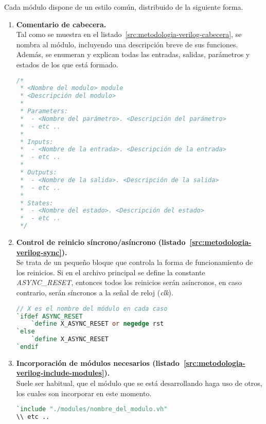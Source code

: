 Cada módulo dispone de un estilo común, distribuido de la siguiente forma.
\begin{enumerate}
    \item{\textbf{Comentario de cabecera.}} \\
    Tal como se muestra en el listado~\ref{src:metodologia-verilog-cabecera}, se nombra al módulo, incluyendo una descripción breve de sus funciones. Además, se enumeran y explican todas las entradas, salidas, parámetros y estados de los que está formado.
    \begin{lstlisting}[language=Verilog,
        caption={Ejemplo de comentario de cabecera del módulo.},
        label=src:metodologia-verilog-cabecera]
/*
 * <Nombre del modulo> module
 * <Descripción del modulo>
 *
 * Parameters:
 *  - <Nombre del parámetro>. <Descripción del parámetro>
 *  - etc ..
 *
 * Inputs:
 *  - <Nombre de la entrada>. <Descripción de la entrada>
 *  - etc ..
 *
 * Outputs:
 *  - <Nombre de la salida>. <Descripción de la salida>
 *  - etc ..
 *
 * States:
 *  - <Nombre del estado>. <Descripción del estado>
 *  - etc ..
 */
    \end{lstlisting}

    \item{\textbf{Control de reinicio síncrono/asíncrono (listado~\ref{src:metodologia-verilog-sync}).}} \\
    Se trata de un pequeño bloque que controla la forma de funcionamiento de los reinicios. Si en el archivo principal se define la constante \emph{ASYNC\_RESET}, entonces todos los reinicios serán asíncronos, en caso contrario, serán síncronos a la señal de reloj (\emph{clk}).
    \begin{lstlisting}[language=Verilog,
        caption={Ejemplo de control de reinicio síncrono/asíncrono.},
        label=src:metodologia-verilog-sync]
// X es el nombre del módulo en cada caso
`ifdef ASYNC_RESET
    `define X_ASYNC_RESET or negedge rst
`else
    `define X_ASYNC_RESET
`endif
    \end{lstlisting}
        
    \item{\textbf{Incorporación de módulos necesarios (listado~\ref{src:metodologia-verilog-include-modules}).}} \\
    Suele ser habitual, que el módulo que se está desarrollando haga uso de otros, los cuales son incorporar en este momento.
    \begin{lstlisting}[language=Verilog,
        caption={Ejemplo de incorporación de módulos.},
        label=src:metodologia-verilog-include-modules]
`include "./modules/nombre_del_modulo.vh"
\\ etc ..
    \end{lstlisting}
        

\end{enumerate}
